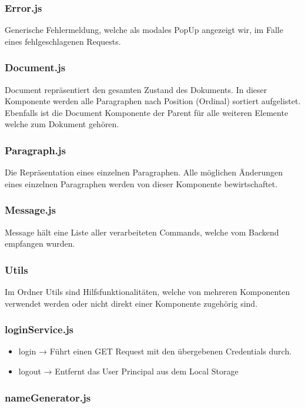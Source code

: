 \subsubsection*{Error.js}
Generische Fehlermeldung, welche als modales PopUp angezeigt wir, im Falle eines fehlgeschlagenen Requests.

\subsubsection*{Document.js}
Document repräsentiert den gesamten Zustand des Dokuments.
In dieser Komponente werden alle Paragraphen nach Position (Ordinal) sortiert aufgelistet.
Ebenfalls ist die Document Komponente der Parent für alle weiteren Elemente welche zum Dokument gehören.

\subsubsection*{Paragraph.js}
Die Repräsentation eines einzelnen Paragraphen.
Alle möglichen Änderungen eines einzelnen Paragraphen werden von dieser Komponente bewirtschaftet.


\subsubsection*{Message.js}
Message hält eine Liste aller verarbeiteten Commands, welche vom Backend empfangen wurden.

\subsubsection{Utils}
Im Ordner Utils sind Hilfsfunktionalitäten, welche von mehreren Komponenten verwendet werden oder nicht direkt einer Komponente zugehörig sind.

\subsubsection*{loginService.js}

\begin{itemize}
    \item login → Führt einen GET Request mit den übergebenen Credentials durch.
    \item logout → Entfernt das User Principal aus dem Local Storage
\end{itemize}

\subsubsection*{nameGenerator.js}

